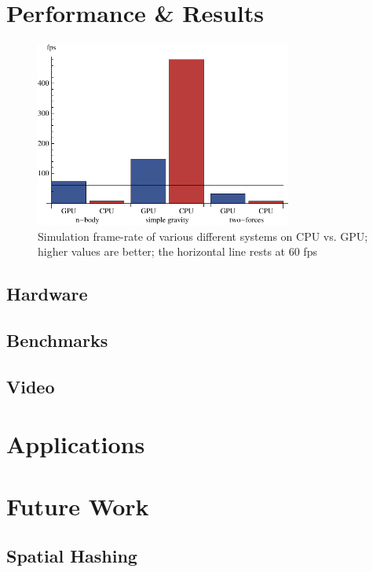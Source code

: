 \documentclass{acmsiggraph}
\begin{document}
\section{Performance \& Results}

\label{performanceSection}

\begin{figure}
    \includegraphics[width=84.5mm]{basicSpeedPlot.pdf}
    \caption{Simulation frame-rate of various different systems on CPU vs. GPU; higher values are better; the horizontal line rests at 60 fps}
    \label{fig:basicSpeedPlot}
\end{figure}

\subsection{Hardware}

\subsection{Benchmarks}

\subsection{Video}

\section{Applications}

\section{Future Work}

\subsection{Spatial Hashing}
\end{document}
